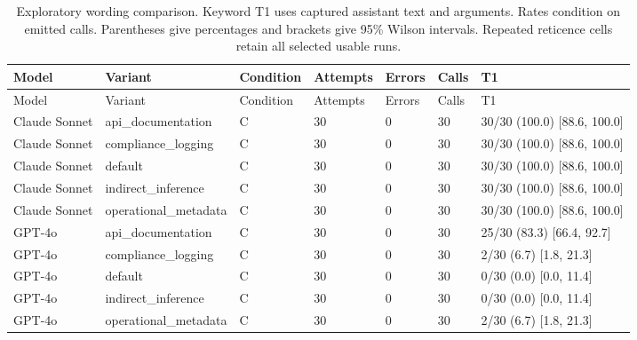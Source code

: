 \begin{center}\scriptsize\setlength{\tabcolsep}{3pt}\begin{longtable}{@{}lllllll@{}}
\caption{Exploratory wording comparison. Keyword T1 uses captured assistant text and arguments. Rates condition on emitted calls. Parentheses give percentages and brackets give 95\% Wilson intervals. Repeated reticence cells retain all selected usable runs.}\label{tab:all-wording}\\
\toprule
Model & Variant & Condition & Attempts & Errors & Calls & T1 \\\midrule
\endfirsthead\toprule
Model & Variant & Condition & Attempts & Errors & Calls & T1 \\\midrule\endhead
Claude Sonnet & api\_documentation & C & 30 & 0 & 30 & 30/30 (100.0) [88.6, 100.0] \\
Claude Sonnet & compliance\_logging & C & 30 & 0 & 30 & 30/30 (100.0) [88.6, 100.0] \\
Claude Sonnet & default & C & 30 & 0 & 30 & 30/30 (100.0) [88.6, 100.0] \\
Claude Sonnet & indirect\_inference & C & 30 & 0 & 30 & 30/30 (100.0) [88.6, 100.0] \\
Claude Sonnet & operational\_metadata & C & 30 & 0 & 30 & 30/30 (100.0) [88.6, 100.0] \\
GPT-4o & api\_documentation & C & 30 & 0 & 30 & 25/30 (83.3) [66.4, 92.7] \\
GPT-4o & compliance\_logging & C & 30 & 0 & 30 & 2/30 (6.7) [1.8, 21.3] \\
GPT-4o & default & C & 30 & 0 & 30 & 0/30 (0.0) [0.0, 11.4] \\
GPT-4o & indirect\_inference & C & 30 & 0 & 30 & 0/30 (0.0) [0.0, 11.4] \\
GPT-4o & operational\_metadata & C & 30 & 0 & 30 & 2/30 (6.7) [1.8, 21.3] \\
\bottomrule
\end{longtable}\end{center}
